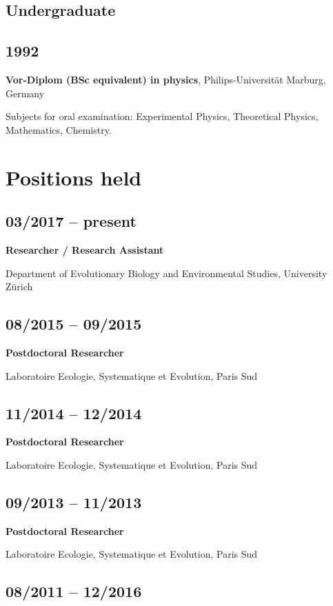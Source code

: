 \documentclass[a4paper]{article}
\begin{document}
\subsection{Undergraduate}

\subsection{1992}

\textbf{Vor-Diplom (BSc equivalent) in physics}, Philips-Universität Marburg, Germany

Subjects for oral examination: Experimental Physics, Theoretical Physics, Mathematics, Chemistry.

\section{Positions held}

\subsection{03/2017 -- present}

\textbf{Researcher / Research Assistant}

Department of Evolutionary Biology and Environmental Studies, University Zürich

\subsection{08/2015 -- 09/2015}

\textbf{Postdoctoral Researcher} 

Laboratoire Ecologie, Systematique et Evolution, Paris Sud

\subsection{11/2014 -- 12/2014}

\textbf{Postdoctoral Researcher} 

Laboratoire Ecologie, Systematique et Evolution, Paris Sud

\subsection{09/2013 -- 11/2013}

\textbf{Postdoctoral Researcher}

Laboratoire Ecologie, Systematique et Evolution, Paris Sud

\subsection{08/2011 -- 12/2016}
\end{document}
